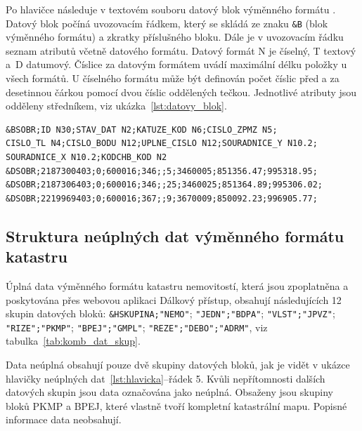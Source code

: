 Po hlavičce následuje v textovém souboru  datový blok
výměnného formátu . Datový blok počíná uvozovacím řádkem,
který se skládá ze znaku \verb|&B| (blok výměnného formátu) a zkratky
příslušného bloku. Dále je v uvozovacím řádku seznam atributů včetně
datového formátu. Datový formát N je číselný, T textový a~D
datumový. Číslice za datovým formátem uvádí maximální délku položky u
všech formátů. U číselného formátu může být definován počet číslic
před a za desetinnou čárkou pomocí dvou číslic oddělených
tečkou. Jednotlivé atributy jsou odděleny středníkem, viz
ukázka~\ref{lst:datovy_blok}.

{\small
\begin{lstlisting}[caption=Ukázka datového bloku SOBR (souřadnice obrazu bodů polohopisu v mapě) neúplných dat, label=lst:datovy_blok]
&BSOBR;ID N30;STAV_DAT N2;KATUZE_KOD N6;CISLO_ZPMZ N5;
CISLO_TL N4;CISLO_BODU N12;UPLNE_CISLO N12;SOURADNICE_Y N10.2;
SOURADNICE_X N10.2;KODCHB_KOD N2
&DSOBR;2187300403;0;600016;346;;5;3460005;851356.47;995318.95;
&DSOBR;2187306403;0;600016;346;;25;3460025;851364.89;995306.02;
&DSOBR;2219969403;0;600016;367;;9;3670009;850092.23;996905.77;
\end{lstlisting}}

\subsection{Struktura neúplných dat výměnného formátu katastru}
\label{subsec:neuplna_data}
Úplná data výměnného formátu katastru nemovitostí, která jsou
zpoplatněna a poskytována přes webovou aplikaci Dálkový přístup,
obsahují následujících 12 skupin datových bloků:
\verb|&HSKUPINA;"NEMO"|; \verb|"JEDN";"BDPA"|; \verb|"VLST";"JPVZ"|;
\verb|"RIZE";"PKMP"|; \verb|"BPEJ";"GMPL"|;
\verb|"REZE";"DEBO";"ADRM"|, viz tabulka~\ref{tab:komb_dat_skup}.

Data neúplná obsahují pouze dvě skupiny datových bloků, jak je vidět v
ukázce hlavičky neúplných dat~\ref{lst:hlavicka}--řádek 5. Kvůli
nepřítomnosti dalších datových skupin jsou data označována jako
neúplná. Obsaženy jsou skupiny bloků PKMP a BPEJ, které vlastně tvoří
kompletní katastrální mapu. Popisné informace data neobsahují.

